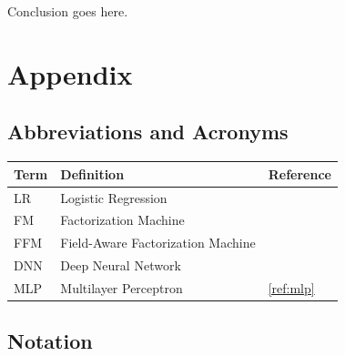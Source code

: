 \documentclass{mldsmsc}
\begin{document}
Conclusion goes here. 





\clearpage
\renewcommand*{\thepage}{A\arabic{page}}

\appendix
%
\chapter{Appendix}

\section{Abbreviations and Acronyms}
\label{app:acronyms}

\begin{table}[ht]
    \begin{tabular}{|l|l|l|}
      \hline
        \textbf{Term} & \textbf{Definition} & \textbf{Reference} \\
      \hline
        LR& Logistic Regression & \\
        FM & Factorization Machine & \\
        FFM & Field-Aware Factorization Machine & \\
        DNN & Deep Neural Network & \\
        MLP & Multilayer Perceptron & \ref{ref:mlp} \\
    \hline
    \end{tabular}
\end{table}


\section{Notation}
\label{app:notation}
\end{document}
